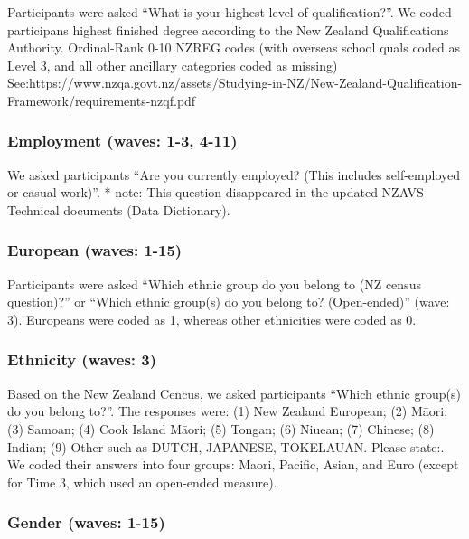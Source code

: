 \documentclass[
  singlecolumn]{report}
\begin{document}
Participants were asked ``What is your highest level of
qualification?''. We coded participans highest finished degree according
to the New Zealand Qualifications Authority. Ordinal-Rank 0-10 NZREG
codes (with overseas school quals coded as Level 3, and all other
ancillary categories coded as missing)
See:https://www.nzqa.govt.nz/assets/Studying-in-NZ/New-Zealand-Qualification-Framework/requirements-nzqf.pdf

\hypertarget{employment-waves-1-3-4-11}{%
\subsubsection{Employment (waves: 1-3,
4-11)}\label{employment-waves-1-3-4-11}}

We asked participants ``Are you currently employed? (This includes
self-employed or casual work)''. * note: This question disappeared in
the updated NZAVS Technical documents (Data Dictionary).

\hypertarget{european-waves-1-15}{%
\subsubsection{European (waves: 1-15)}\label{european-waves-1-15}}

Participants were asked ``Which ethnic group do you belong to (NZ census
question)?'' or ``Which ethnic group(s) do you belong to? (Open-ended)''
(wave: 3). Europeans were coded as 1, whereas other ethnicities were
coded as 0.

\hypertarget{ethnicity-waves-3}{%
\subsubsection{Ethnicity (waves: 3)}\label{ethnicity-waves-3}}

Based on the New Zealand Cencus, we asked participants ``Which ethnic
group(s) do you belong to?''. The responses were: (1) New Zealand
European; (2) Māori; (3) Samoan; (4) Cook Island Māori; (5) Tongan; (6)
Niuean; (7) Chinese; (8) Indian; (9) Other such as DUTCH, JAPANESE,
TOKELAUAN. Please state:. We coded their answers into four groups:
Maori, Pacific, Asian, and Euro (except for Time 3, which used an
open-ended measure).

\hypertarget{gender-waves-1-15}{%
\subsubsection{Gender (waves: 1-15)}\label{gender-waves-1-15}}
\end{document}
